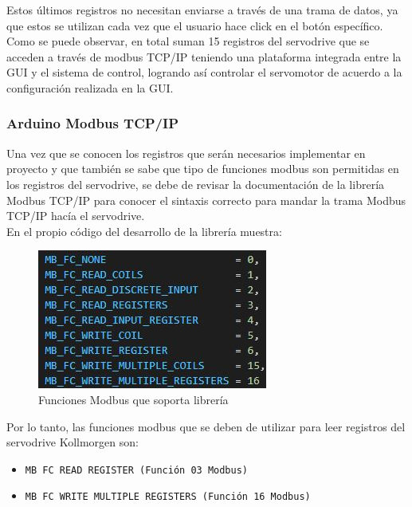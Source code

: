 \documentclass[12pt,titlepage]{article}
\begin{document}
Estos últimos registros no necesitan enviarse a través de una trama de datos, ya que estos se utilizan cada vez que el usuario hace click en el botón específico. \\ 

Como se puede observar,  en total suman 15 registros del servodrive que se acceden a través de modbus TCP/IP teniendo una plataforma integrada entre la GUI y el sistema de control, logrando así controlar el servomotor de acuerdo a la configuración realizada en la GUI. \\
\newpage
\subsubsection{Arduino Modbus TCP/IP}
Una vez que se conocen los registros que serán necesarios implementar en proyecto y que también se sabe que tipo de funciones modbus son permitidas en los registros del servodrive, se debe de revisar la documentación de la librería Modbus TCP/IP para conocer el sintaxis correcto para mandar la trama Modbus TCP/IP hacía el servodrive. \\ 

En el propio código del desarrollo de la librería muestra: \\ 

 \begin{figure}[htbp]
\hspace*{6.1cm} 
\includegraphics[scale=0.68]{funciones_lib}
\caption{Funciones Modbus que soporta librería}
\end{figure}

Por lo tanto, las funciones modbus que se deben de utilizar para leer registros del servodrive Kollmorgen son: \\
\begin{itemize}
\item \texttt{MB FC READ REGISTER (Función 03 Modbus)}
\item \texttt{MB FC WRITE MULTIPLE REGISTERS (Función 16 Modbus)\\}
\end{itemize}
\end{document}
